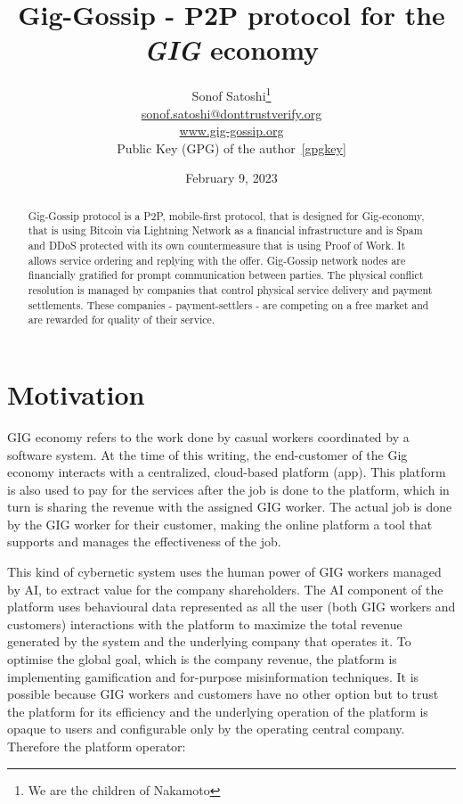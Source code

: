 \documentclass{article}
\title{Gig-Gossip - P2P protocol for the \emph{GIG} economy}
\date{February 9, 2023}
\author{
	{Sonof Satoshi}\thanks{We are the children of Nakamoto} \\
	\href{mailto:sonof.satoshi@donttrustverify.org}{sonof.satoshi@donttrustverify.org}\\
	\href{https://www.gig-gossip.org}{www.gig-gossip.org}\\
	Public Key (GPG) of the author~\ref{gpgkey} \\
}
\begin{document}
\maketitle

\begin{abstract}
Gig-Gossip protocol is a P2P, mobile-first protocol, that is designed for Gig-economy, that is using Bitcoin via Lightning Network as a financial infrastructure and is Spam and DDoS protected with its own countermeasure that is using Proof of Work. It allows service ordering and replying with the offer. Gig-Gossip network nodes are financially gratified for prompt communication between parties. The physical conflict resolution is managed by companies that control physical service delivery and payment settlements. These companies - payment-settlers - are competing on a free market and are rewarded for quality of their service.
\end{abstract}



\section{Motivation}
GIG economy refers to the work done by casual workers coordinated by a software system. At the time of this writing, the end-customer of the Gig economy interacts with a centralized, cloud-based platform (app). This platform is also used to pay for the services after the job is done to the platform, which in turn is sharing the revenue with the assigned GIG worker. The actual job is done by the GIG worker for their customer, making the online platform a tool that supports and manages the effectiveness of the job.

This kind of cybernetic system uses the human power of GIG workers managed by AI, to extract value for the company shareholders. The AI component of the platform uses behavioural data represented as all the user (both GIG workers and customers) interactions with the platform to maximize the total revenue generated by the system and the underlying company that operates it. To optimise the global goal, which is the company revenue, the platform is implementing gamification and for-purpose misinformation techniques. It is possible because GIG workers and customers have no other option but to trust the platform for its efficiency and the underlying operation of the platform is opaque to users and configurable only by the operating central company. Therefore the platform operator:
\end{document}
